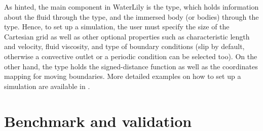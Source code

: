\documentclass[10pt,a4paper]{article}
\begin{document}
As hinted, the main component in WaterLily is the  type, which holds information about the fluid through the  type, and the immersed body (or bodies) through the  type. Hence, to set up a simulation, the user must specify the size of the Cartesian grid as well as other optional properties such as characteristic length and velocity, fluid viscosity, and type of boundary conditions (slip by default, otherwise a convective outlet or a periodic condition can be selected too). On the other hand, the  type holds the signed-distance function as well as the coordinates mapping for moving boundaries. More detailed examples on how to set up a simulation are available in .

\section{Benchmark and validation} \label{sec:benchmark_validation}
\end{document}

